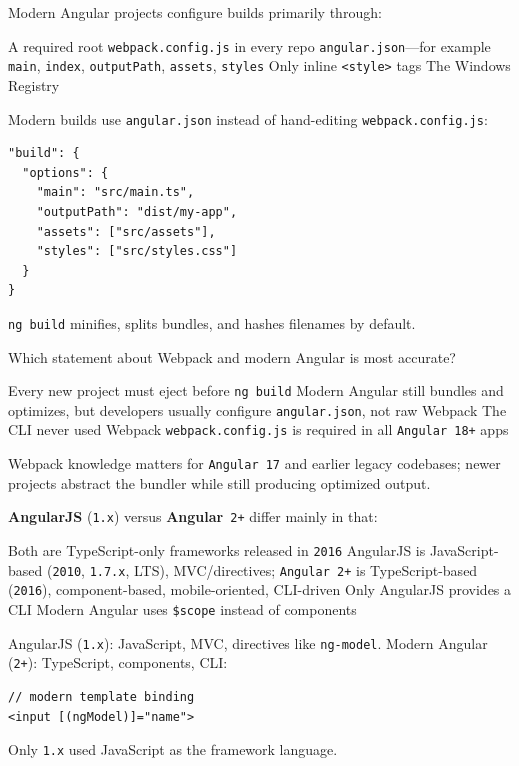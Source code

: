 \question[4]
Modern Angular projects configure builds primarily through:
\begin{choices}
  \choice A required root \texttt{webpack.config.js} in every repo
  \CorrectChoice \texttt{angular.json}---for example \texttt{main}, \texttt{index}, \texttt{outputPath}, \texttt{assets}, \texttt{styles}
  \choice Only inline \texttt{<style>} tags
  \choice The Windows Registry
\end{choices}
\begin{solution}
  Modern builds use \lstinline[style=bashinline]{angular.json} instead of hand-editing \lstinline[style=bashinline]{webpack.config.js}:
\begin{lstlisting}[style=json]
"build": {
  "options": {
    "main": "src/main.ts",
    "outputPath": "dist/my-app",
    "assets": ["src/assets"],
    "styles": ["src/styles.css"]
  }
}
\end{lstlisting}
  \lstinline[style=bashinline]{ng build} minifies, splits bundles, and hashes filenames by default.
\end{solution}

\question[4]
Which statement about Webpack and modern Angular is most accurate?
\begin{choices}
  \choice Every new project must eject before \texttt{ng build}
  \CorrectChoice Modern Angular still bundles and optimizes, but developers usually configure \texttt{angular.json}, not raw Webpack
  \choice The CLI never used Webpack
  \choice \texttt{webpack.config.js} is required in all \texttt{Angular~18+} apps
\end{choices}
\begin{solution}
  Webpack knowledge matters for \texttt{Angular~17} and earlier legacy codebases; newer projects abstract the bundler while still producing optimized output.
\end{solution}

\question[4]
\textbf{AngularJS} (\texttt{1.x}) versus \textbf{Angular}~\texttt{2+} differ mainly in that:
\begin{choices}
  \choice Both are TypeScript-only frameworks released in \texttt{2016}
  \CorrectChoice AngularJS is JavaScript-based (\texttt{2010}, \texttt{1.7.x}, LTS), MVC/directives; \texttt{Angular~2+} is TypeScript-based (\texttt{2016}), component-based, mobile-oriented, CLI-driven
  \choice Only AngularJS provides a CLI
  \choice Modern Angular uses \texttt{\$scope} instead of components
\end{choices}
\begin{solution}
  AngularJS (\texttt{1.x}): JavaScript, MVC, directives like \lstinline[style=js]{ng-model}. Modern Angular (\texttt{2+}): TypeScript, components, CLI:
\begin{lstlisting}[style=ts]
// modern template binding
<input [(ngModel)]="name">
\end{lstlisting}
  Only \texttt{1.x} used JavaScript as the framework language.
\end{solution}

